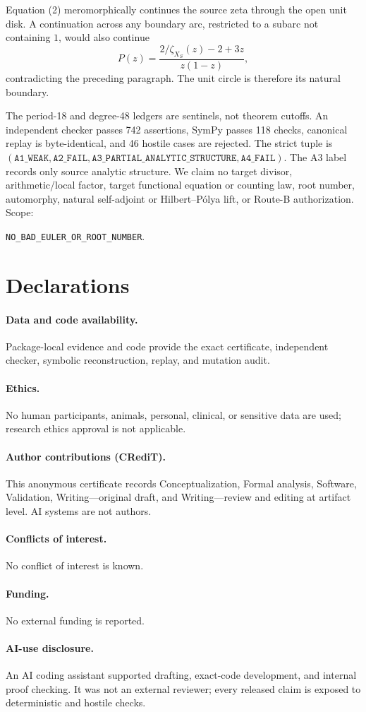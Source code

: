 \documentclass[10pt]{article}
\begin{document}
Equation (2) meromorphically continues the source zeta through the open unit
disk.  A continuation across any boundary arc, restricted to a subarc not
containing $1$, would also continue
\[
P(z)=\frac{2/\zeta_{X_S}(z)-2+3z}{z(1-z)},
\]
contradicting the preceding paragraph.  The unit circle is therefore its
natural boundary.

The period-18 and degree-48 ledgers are sentinels, not theorem cutoffs.  An
independent checker passes 742 assertions, SymPy passes 118 checks, canonical
replay is byte-identical, and 46 hostile cases are rejected.  The strict
tuple is $(\texttt{A1\_WEAK},\texttt{A2\_FAIL},
\texttt{A3\_PARTIAL\_ANALYTIC\_STRUCTURE},\texttt{A4\_FAIL})$.
The A3 label records only source analytic structure.  We claim no target
divisor, arithmetic/local factor, target functional equation or counting
law, root number, automorphy, natural self-adjoint or Hilbert--P\'olya lift,
or Route-B authorization.  Scope:
\begin{center}\texttt{NO\_BAD\_EULER\_OR\_ROOT\_NUMBER}.\end{center}

\section*{Declarations}
\paragraph{Data and code availability.}
Package-local evidence and code provide the exact certificate, independent
checker, symbolic reconstruction, replay, and mutation audit.
\paragraph{Ethics.}
No human participants, animals, personal, clinical, or sensitive data are
used; research ethics approval is not applicable.
\paragraph{Author contributions (CRediT).}
This anonymous certificate records Conceptualization, Formal analysis,
Software, Validation, Writing---original draft, and Writing---review and
editing at artifact level.  AI systems are not authors.
\paragraph{Conflicts of interest.} No conflict of interest is known.
\paragraph{Funding.} No external funding is reported.
\paragraph{AI-use disclosure.}
An AI coding assistant supported drafting, exact-code development, and
internal proof checking.  It was not an external reviewer; every released
claim is exposed to deterministic and hostile checks.
\end{document}
